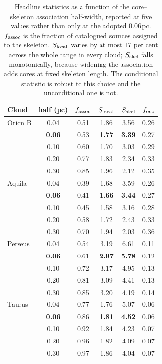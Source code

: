 \documentclass[usenatbib,twoside,twocolumn]{mnras}
\begin{document}
\begin{table}
\caption{Headline statistics as a function of the core--skeleton association half-width, reported at five values rather than only at the adopted $0.06$\,pc. $f_{\rm assoc}$ is the fraction of catalogued sources assigned to the skeleton. $S_{\rm local}$ varies by at most $17$ per cent across the whole range in every cloud; $S_{\rm skel}$ falls monotonically, because widening the association adds cores at fixed skeleton length. The conditional statistic is robust to this choice and the unconditional one is not.}
\label{tab:radsweep}
\footnotesize
\setlength{\tabcolsep}{4pt}
\begin{tabular}{lccccc}
\toprule
Cloud & half (pc) & $f_{\rm assoc}$ & $S_{\rm local}$ & $S_{\rm skel}$ & $f_{\rm occ}$ \\
\midrule
Orion B & 0.04 & 0.51 & 1.86 & 3.56 & 0.26 \\
        & \textbf{0.06} & 0.53 & \textbf{1.77} & \textbf{3.39} & 0.27 \\
        & 0.10 & 0.60 & 1.70 & 3.03 & 0.29 \\
        & 0.20 & 0.77 & 1.83 & 2.34 & 0.33 \\
        & 0.30 & 0.85 & 1.96 & 2.12 & 0.35 \\
\midrule
Aquila  & 0.04 & 0.39 & 1.68 & 3.59 & 0.26 \\
        & \textbf{0.06} & 0.41 & \textbf{1.66} & \textbf{3.44} & 0.27 \\
        & 0.10 & 0.45 & 1.58 & 3.16 & 0.28 \\
        & 0.20 & 0.58 & 1.72 & 2.43 & 0.33 \\
        & 0.30 & 0.70 & 1.94 & 2.03 & 0.36 \\
\midrule
Perseus & 0.04 & 0.54 & 3.19 & 6.61 & 0.11 \\
        & \textbf{0.06} & 0.61 & \textbf{2.97} & \textbf{5.78} & 0.12 \\
        & 0.10 & 0.72 & 3.17 & 4.95 & 0.13 \\
        & 0.20 & 0.81 & 3.09 & 4.41 & 0.13 \\
        & 0.30 & 0.85 & 3.20 & 4.19 & 0.14 \\
\midrule
Taurus  & 0.04 & 0.77 & 1.76 & 5.07 & 0.06 \\
        & \textbf{0.06} & 0.86 & \textbf{1.81} & \textbf{4.52} & 0.06 \\
        & 0.10 & 0.92 & 1.84 & 4.23 & 0.07 \\
        & 0.20 & 0.96 & 1.82 & 4.09 & 0.07 \\
        & 0.30 & 0.97 & 1.86 & 4.04 & 0.07 \\
\bottomrule
\end{tabular}
\end{table}
\end{document}
